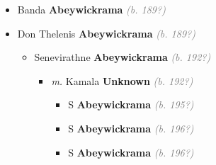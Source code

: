 \documentclass[10pt, openany]{book}
\begin{document}
\begin{itemize}
{\begin{itemize}
{\begin{itemize}
{\begin{itemize}
{\begin{itemize}
{\begin{itemize}
{ }
\end{itemize}}
\end{itemize}
 }
\item{II \textbf{Weerakone} \textcolor{gray}{\textit{(b. 192?)}}
\begin{itemize}
\item{\textit{m.} Mister \textbf{Weerakone} \textcolor{gray}{\textit{(b. 191?)}}   \label{couple:00000925:00000929} \begin{itemize}
\item{S \textbf{Weerakone} \textcolor{gray}{\textit{(b. 194?)}}
 }
\end{itemize}}
\end{itemize}
 }
\end{itemize}}
\end{itemize}
 }
\item{Banda \textbf{Abeywickrama} \textcolor{gray}{\textit{(b. 189?)}}
 }
\item{Don Thelenis \textbf{Abeywickrama} \textcolor{gray}{\textit{(b. 189?)}}
\begin{itemize}
\item{Senevirathne \textbf{Abeywickrama} \textcolor{gray}{\textit{(b. 192?)}}
\begin{itemize}
\item{\textit{m.} Kamala \textbf{Unknown} \textcolor{gray}{\textit{(b. 192?)}}   \label{couple:00000050:00000886} \begin{itemize}
\item{S \textbf{Abeywickrama} \textcolor{gray}{\textit{(b. 195?)}}
 }
\item{S \textbf{Abeywickrama} \textcolor{gray}{\textit{(b. 196?)}}
 }
\item{S \textbf{Abeywickrama} \textcolor{gray}{\textit{(b. 196?)}}
 }
\end{itemize}}
\end{itemize}
 }
\end{itemize}
  }
\end{itemize}}
\end{itemize}
  
\end{document}
